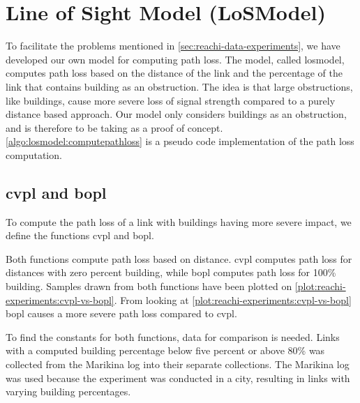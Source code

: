 \section{Line of Sight Model (LoSModel)}
To facilitate the problems mentioned in \autoref{sec:reachi-data-experiments}, we have developed our own model for computing path loss. The model, called \gls{losmodel}, computes path loss based on the distance of the link and the percentage of the link that contains building as an obstruction. The idea is that large obstructions, like buildings, cause more severe loss of signal strength compared to a purely distance based approach. Our model only considers buildings as an obstruction, and is therefore to be taking as a proof of concept. \autoref{algo:losmodel:computepathloss} is a pseudo code implementation of the path loss computation.



\subsection{\acrfull{cvpl} and \acrfull{bopl}}
To compute the path loss of a link with buildings having more severe impact, we define the functions \gls{cvpl} and \gls{bopl}.


Both functions compute path loss based on distance. \gls{cvpl} computes path loss for distances with zero percent building, while \gls{bopl} computes path loss for 100\% building. Samples drawn from both functions have been plotted on \autoref{plot:reachi-experiments:cvpl-vs-bopl}. From looking at \autoref{plot:reachi-experiments:cvpl-vs-bopl} \gls{bopl} causes a more severe path loss compared to \gls{cvpl}.\medbreak

To find the constants for both functions, data for comparison is needed. Links with a computed building percentage below five percent or above 80\% was collected from the Marikina log into their separate collections. The Marikina log was used because the experiment was conducted in a city, resulting in links with varying building percentages.

